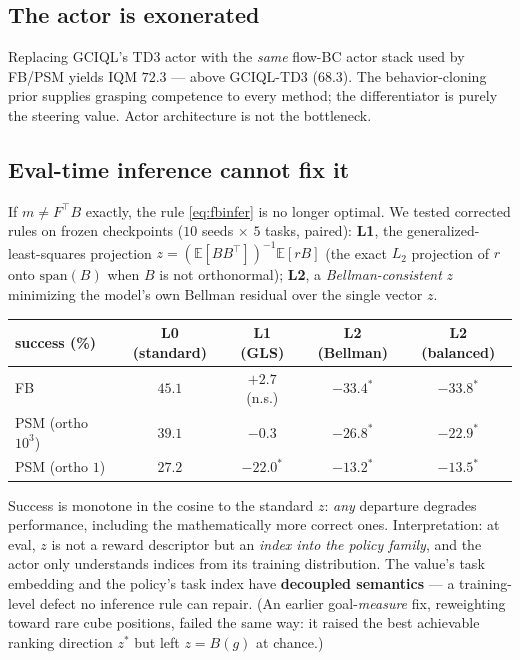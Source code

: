 \documentclass[11pt,a4paper]{article}
\newcommand{\E}{\mathbb{E}}
\begin{document}
\subsection{The actor is exonerated}
Replacing GCIQL's TD3 actor with the \emph{same} flow-BC actor stack used by FB/PSM yields IQM
$72.3$ --- above GCIQL-TD3 ($68.3$). The behavior-cloning prior supplies grasping competence to
every method; the differentiator is purely the steering value. Actor architecture is not the
bottleneck.

\subsection{Eval-time inference cannot fix it}\label{sec:ladder}
If $m\neq F^{\top}B$ exactly, the rule \eqref{eq:fbinfer} is no longer optimal. We tested
corrected rules on frozen checkpoints ($10$ seeds $\times$ $5$ tasks, paired): \textbf{L1}, the
generalized-least-squares projection $z=(\E[BB^{\top}])^{-1}\E[rB]$ (the exact $L_2$ projection of
$r$ onto $\mathrm{span}(B)$ when $B$ is not orthonormal); \textbf{L2}, a \emph{Bellman-consistent}
$z$ minimizing the model's own Bellman residual over the single vector $z$.
\begin{center}\small
\begin{tabular}{@{}lcccc@{}}
\toprule
success (\%) & L0 (standard) & L1 (GLS) & L2 (Bellman) & L2 (balanced)\\
\midrule
FB & $45.1$ & $+2.7$ (n.s.) & $-33.4^{*}$ & $-33.8^{*}$\\
PSM (ortho $10^{3}$) & $39.1$ & $-0.3$ & $-26.8^{*}$ & $-22.9^{*}$\\
PSM (ortho $1$) & $27.2$ & $-22.0^{*}$ & $-13.2^{*}$ & $-13.5^{*}$\\
\bottomrule
\end{tabular}
\end{center}
Success is monotone in the cosine to the standard $z$: \emph{any} departure degrades performance,
including the mathematically more correct ones. Interpretation: at eval, $z$ is not a reward
descriptor but an \emph{index into the policy family}, and the actor only understands indices from
its training distribution. The value's task embedding and the policy's task index have
\textbf{decoupled semantics} --- a training-level defect no inference rule can repair. (An earlier
goal-\emph{measure} fix, reweighting toward rare cube positions, failed the same way: it raised
the best achievable ranking direction $z^{*}$ but left $z=B(g)$ at chance.)
\end{document}
